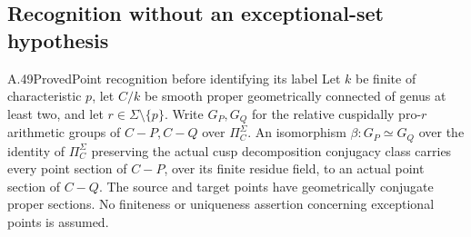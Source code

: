 \subsection{Recognition without an exceptional-set hypothesis}

\begin{claim}{A.49}{Proved}{Point recognition before identifying its label}
Let $k$ be finite of characteristic $p$, let $C/k$ be smooth proper
geometrically connected of genus at least two, and let
$r\in\Sigma\setminus\{p\}$. Write $G_P,G_Q$ for the relative
cuspidally pro-$r$ arithmetic groups of $C-P,C-Q$ over
$\Pi_C^\Sigma$. An isomorphism $\beta:G_P\simeq G_Q$ over the
identity of $\Pi_C^\Sigma$ preserving the actual cusp decomposition
conjugacy class carries every point section of $C-P$, over its
finite residue field, to an actual point section of $C-Q$.
The source and target points have geometrically conjugate proper
sections. No finiteness or uniqueness assertion concerning
exceptional points is assumed.
\end{claim}
